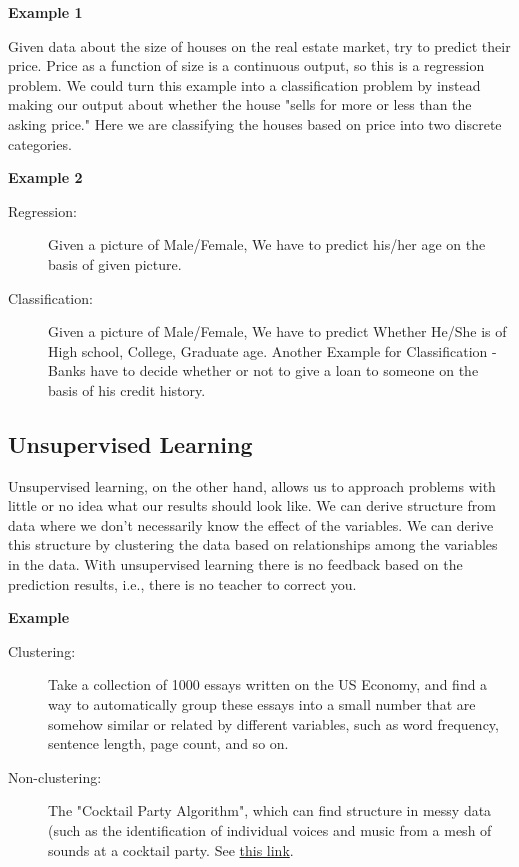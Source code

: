 \documentclass[a4paper,11pt]{report}
\begin{document}
\textbf{Example 1}

Given data about the size of houses on the real estate market, try to predict their price. Price as a function of size is a continuous output, so this is a regression problem.
We could turn this example into a classification problem by instead making our output about whether the house "sells for more or less than the asking price." Here we are classifying the houses based on price into two discrete categories.

\newpage

\textbf{Example 2}
\begin{description}
 \item [Regression:] Given a picture of Male/Female, We have to predict his/her age on the basis of given picture.
 \item [Classification:] Given a picture of Male/Female, We have to predict Whether He/She is of High school, College, Graduate age. Another Example for Classification - Banks have to decide whether or not to give a loan to someone on the basis of his credit history.
\end{description}

\subsection*{Unsupervised Learning}

Unsupervised learning, on the other hand, allows us to approach problems with little or no idea what our results should look like. We can derive structure from data where we don't necessarily know the effect of the variables. We can derive this structure by clustering the data based on relationships among the variables in the data. With unsupervised learning there is no feedback based on the prediction results, i.e., there is no teacher to correct you.

\textbf{Example}
\begin{description}
\item[Clustering:] Take a collection of 1000 essays written on the US Economy, and find a way to automatically group these essays into a small number that are somehow similar or related by different variables, such as word frequency, sentence length, page count, and so on.
\item[Non-clustering:] The "Cocktail Party Algorithm", which can find structure in messy data (such as the identification of individual voices and music from a mesh of sounds at a cocktail party. See \href{https://en.wikipedia.org/wiki/Cocktail_party_effect}{this link}.
\end{description}
\end{document}
